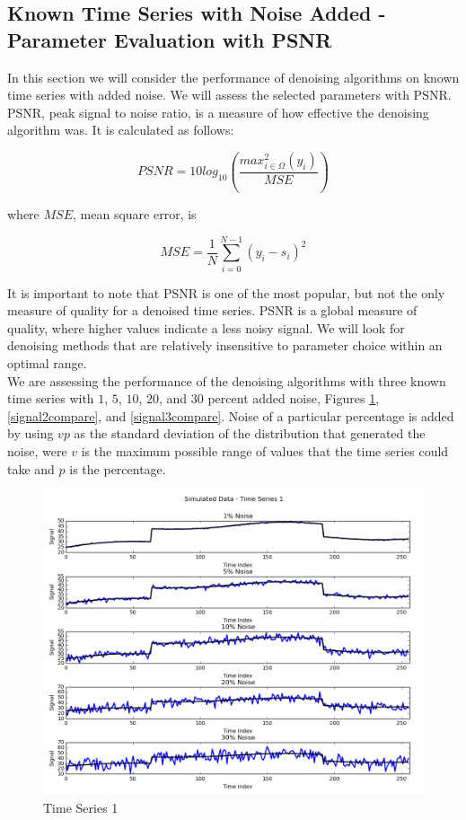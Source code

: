 \documentclass[11pt]{article}
\theoremstyle{definition}
\begin{document}
\subsection{Known Time Series with Noise Added - Parameter Evaluation with PSNR}

In this section we will consider the performance of denoising algorithms on known time series with added noise. We will assess the selected parameters with PSNR.\\

PSNR, peak signal to noise ratio, is a measure of how effective the denoising algorithm was. It is calculated as follows:

\begin{displaymath}
PSNR = 10 log_{10} \left( \frac{max _{i \in \Omega} ^2 \left( y_i \right)}{MSE} \right)
\end{displaymath}

where $MSE$, mean square error, is

\begin{displaymath}
MSE = \frac{1}{N} \sum _{i = 0} ^{N - 1} \left( y_i - s_i \right) ^2
\end{displaymath}

It is important to note that PSNR is one of the most popular, but not the only measure of quality for a denoised time series. PSNR is a global measure of quality, where higher values indicate a less noisy signal. We will look for denoising methods that are relatively insensitive to parameter choice within an optimal range.\\

We are assessing the performance of the denoising algorithms with three known time series with $1$, $5$, $10$, $20$, and $30$ percent added noise, Figures \ref{signal1compare}, \ref{signal2compare}, and \ref{signal3compare}. Noise of a particular percentage is added by using $v p$ as the standard deviation of the distribution that generated the noise, were $v$ is the maximum possible range of values that the time series could take and $p$ is the percentage.\\

\begin{figure}
\centering
\includegraphics[width = 0.75 \textwidth]{Signal1Compare.png}
\caption{Time Series 1}
\label{signal1compare}
\end{figure}
\end{document}
